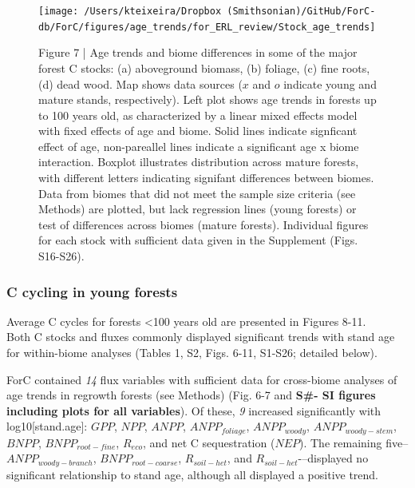 \documentclass[
]{article}
\begin{document}
\begin{figure}[H]

{\centering \texttt{[image: /Users/kteixeira/Dropbox (Smithsonian)/GitHub/ForC-db/ForC/figures/age\_trends/for\_ERL\_review/Stock\_age\_trends]} 

}

\caption{Figure 7 | Age trends and biome differences in some of the major forest C stocks: (a) aboveground biomass, (b) foliage, (c) fine roots, (d) dead wood. Map shows data sources ($x$ and $o$ indicate young and mature stands, respectively). Left plot shows age trends in forests up to 100 years old, as characterized by a linear mixed effects model with fixed effects of age and biome. Solid lines indicate signficant effect of age, non-pareallel lines indicate a significant age x biome interaction. Boxplot illustrates distribution across mature forests, with different letters indicating signifant differences between biomes. Data from biomes that did not meet the sample size criteria (see Methods) are plotted, but lack regression lines (young forests) or test of differences across biomes (mature forests). Individual figures for each stock with sufficient data given in the Supplement (Figs. S16-S26).}\label{fig:unnamed-chunk-13}
\end{figure}

\hypertarget{c-cycling-in-young-forests}{%
\subsubsection{C cycling in young
forests}\label{c-cycling-in-young-forests}}

Average C cycles for forests \textless100 years old are presented in
Figures 8-11.\\
Both C stocks and fluxes commonly displayed significant trends with
stand age for within-biome analyses (Tables 1, S2, Figs. 6-11, S1-S26;
detailed below).

ForC contained \emph{14} flux variables with sufficient data for
cross-biome analyses of age trends in regrowth forests (see Methods)
(Fig. 6-7 and \textbf{S\#- SI figures including plots for all
variables}). Of these, \emph{9} increased significantly with
log10{[}stand.age{]}: \(GPP\), \(NPP\), \(ANPP\), \(ANPP_{foliage}\),
\(ANPP_{woody}\), \(ANPP_{woody-stem}\), \(BNPP\), \(BNPP_{root-fine}\),
\(R_{eco}\), and net C sequestration (\(NEP\)). The remaining
five--\(ANPP_{woody-branch}\), \(BNPP_{root-coarse}\), \(R_{soil-het}\),
and \(R_{soil-het}\)-\/--displayed no significant relationship to stand
age, although all displayed a positive trend.
\end{document}
